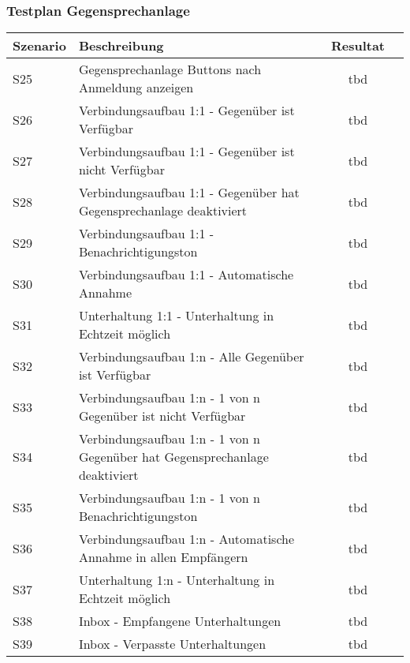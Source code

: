 \subsubsection{Testplan Gegensprechanlage}
\begin{table}[h]
    \centering
    \begin{tabular}{|l|p{11cm}|c|c|}
        \hline
        \textbf{Szenario} & \textbf{Beschreibung}                                                                                                                                  & \textbf{Resultat} \\
        \hline
        S25         & Gegensprechanlage Buttons nach Anmeldung anzeigen & tbd\\
        \hline
        S26         & Verbindungsaufbau 1:1 - Gegenüber ist Verfügbar & tbd\\
        \hline
        S27         & Verbindungsaufbau 1:1 - Gegenüber ist nicht Verfügbar & tbd\\
        \hline
        S28         & Verbindungsaufbau 1:1 - Gegenüber hat Gegensprechanlage deaktiviert & tbd\\
        \hline
        S29         & Verbindungsaufbau 1:1 - Benachrichtigungston & tbd\\
        \hline
        S30         & Verbindungsaufbau 1:1 - Automatische Annahme & tbd\\
        \hline
        S31         & Unterhaltung 1:1 - Unterhaltung in Echtzeit möglich & tbd\\
        \hline
        S32         & Verbindungsaufbau 1:n - Alle Gegenüber ist Verfügbar & tbd\\
        \hline
        S33         & Verbindungsaufbau 1:n - 1 von n Gegenüber ist nicht Verfügbar & tbd\\
        \hline
        S34         & Verbindungsaufbau 1:n - 1 von n Gegenüber hat Gegensprechanlage deaktiviert & tbd\\
        \hline
        S35         & Verbindungsaufbau 1:n - 1 von n Benachrichtigungston & tbd\\
        \hline
        S36         & Verbindungsaufbau 1:n - Automatische Annahme in allen Empfängern & tbd\\
        \hline
        S37         & Unterhaltung 1:n - Unterhaltung in Echtzeit möglich & tbd\\
        \hline
        S38         & Inbox - Empfangene Unterhaltungen & tbd\\
        \hline
        S39         & Inbox - Verpasste Unterhaltungen & tbd\\

\end{tabular}
\end{table}
